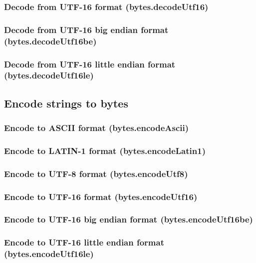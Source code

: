 \documentclass{article}
\theoremstyle{definition}
\begin{document}
\subsubsection{Decode from UTF-16 format (bytes.decodeUtf16)}

\subsubsection{Decode from UTF-16 big endian format (bytes.decodeUtf16be)}

\subsubsection{Decode from UTF-16 little endian format (bytes.decodeUtf16le)}

\subsection{Encode strings to bytes}

\subsubsection{Encode to ASCII format (bytes.encodeAscii)}

\subsubsection{Encode to LATIN-1 format (bytes.encodeLatin1)}

\subsubsection{Encode to UTF-8 format (bytes.encodeUtf8)}

\subsubsection{Encode to UTF-16 format (bytes.encodeUtf16)}

\subsubsection{Encode to UTF-16 big endian format (bytes.encodeUtf16be)}

\subsubsection{Encode to UTF-16 little endian format (bytes.encodeUtf16le)}
\end{document}
